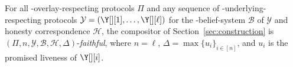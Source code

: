 \begin{conjecture}\label{conj:simulation}
  For all \rollerblade-overlay-respecting protocols $\Pi$
  and any sequence of \rollerblade-underlying-respecting
  protocols $\mathcal{Y} = (\Y[][1], \ldots, \Y[][\ell])$
  for the \rollerblade-belief-system $\mathcal{B}$ of $\mathcal{Y}$
  and honesty correspondence $\mathcal{H}$,
  the compositor \rollerblade of Section~\ref{sec:construction} is
  $(\Pi, n, \mathcal{Y}, \mathcal{B}, \mathcal{H}, \Delta)$-\emph{faithful},
  where $n = \ell$, $\Delta = \max\{u_i\}_{i \in [n]}$,
  and $u_i$ is the promised liveness of $\Y[][i]$.
\end{conjecture}

